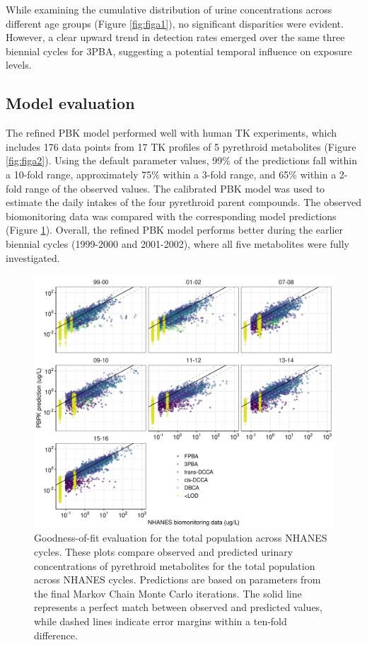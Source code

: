 \documentclass[toxics,article,submit,pdftex,moreauthors]{Definitions/mdpi}
\begin{document}
While examining the cumulative distribution of urine concentrations
across different age groups (Figure \ref{fig:figa1}), no significant
disparities were evident. However, a clear upward trend in detection
rates emerged over the same three biennial cycles for 3PBA, suggesting a
potential temporal influence on exposure levels.

\subsection{Model evaluation}\label{model-evaluation}

The refined PBK model performed well with human TK experiments, which
includes 176 data points from 17 TK profiles of 5 pyrethroid
metabolites (Figure \ref{fig:figa2}). Using the default parameter values, 99\% of the predictions
fall within a 10-fold range, approximately 75\% within a 3-fold range,
and 65\% within a 2-fold range of the observed values. The calibrated
PBK model was used to estimate the daily intakes of the four pyrethroid
parent compounds. The observed biomonitoring data was compared with the
corresponding model predictions (Figure \ref{fig:fig3}). Overall, the
refined PBK model performs better during the earlier biennial cycles
(1999-2000 and 2001-2002), where all five metabolites were fully
investigated.

\begin{figure}[H]
\centering
\begin{adjustwidth}{-2cm}{}
\centering
\includegraphics[width=\linewidth]{figures/fig3}
\hfill
\end{adjustwidth}
\caption{Goodness-of-fit evaluation for the total population across NHANES
cycles. These plots compare observed and predicted urinary concentrations of
pyrethroid metabolites for the total population across NHANES cycles.
Predictions are based on parameters from the final Markov Chain Monte Carlo
iterations. The solid line represents a perfect match between observed and
predicted values, while dashed lines indicate error margins within a ten-fold
difference.\label{fig:fig3}}
\end{figure}
\end{document}

